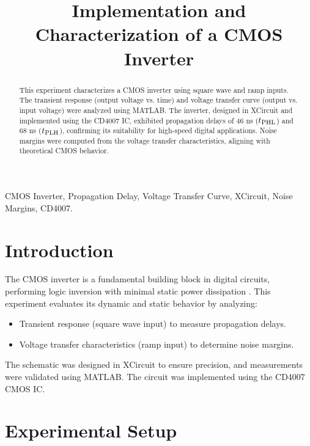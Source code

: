 \documentclass[9pt,conference]{IEEEtran}
\begin{document}
\title{Implementation and Characterization of a CMOS Inverter}
\author{
}
\maketitle

\begin{abstract}
This experiment characterizes a CMOS inverter using square wave and ramp inputs. The transient response (output voltage vs. time) and voltage transfer curve (output vs. input voltage) were analyzed using MATLAB. The inverter, designed in XCircuit and implemented using the CD4007 IC, exhibited propagation delays of 46 ns (\(t\textsubscript{PHL}\)) and 68 ns (\(t\textsubscript{PLH}\)), confirming its suitability for high-speed digital applications. Noise margins were computed from the voltage transfer characteristics, aligning with theoretical CMOS behavior.
\end{abstract}

\begin{IEEEkeywords}
CMOS Inverter, Propagation Delay, Voltage Transfer Curve, XCircuit, Noise Margins, CD4007.
\end{IEEEkeywords}

\section{Introduction}
The CMOS inverter is a fundamental building block in digital circuits, performing logic inversion with minimal static power dissipation \cite{1}. This experiment evaluates its dynamic and static behavior by analyzing:
\begin{itemize}
    \item Transient response (square wave input) to measure propagation delays.
    \item Voltage transfer characteristics (ramp input) to determine noise margins.
\end{itemize}
The schematic was designed in XCircuit to ensure precision, and measurements were validated using MATLAB. The circuit was implemented using the CD4007 CMOS IC.

\section{Experimental Setup}
\end{document}
